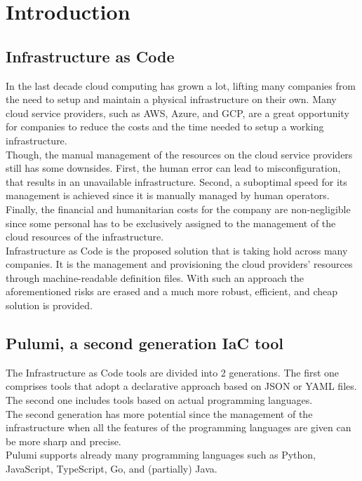 
\chapter{Introduction}
\label{cap:introduction}


\section{Infrastructure as Code}
In the last decade \gls{cloud computing} has grown a lot, lifting many companies from the need to setup and maintain a physical infrastructure on their own.
Many cloud service providers, such as \gls{AWS}, \gls{Azure}, and \gls{GCP}, are a great opportunity for companies to reduce the costs and the time needed to setup a working infrastructure.\\
Though, the manual management of the resources on the cloud service providers still has some downsides. 
First, the human error can lead to misconfiguration, that results in an unavailable infrastructure.
Second, a suboptimal speed for its management is achieved since it is manually managed by human operators.
Finally, the financial and humanitarian costs for the company are non-negligible since some personal has to be exclusively assigned to the management of the cloud resources of the infrastructure.\\
Infrastructure as Code is the proposed solution that is taking hold across many companies.
It is the management and provisioning the cloud providers' resources through machine-readable definition files.
With such an approach the aforementioned risks are erased and a much more robust, efficient, and cheap solution is provided.

\section{Pulumi, a second generation IaC tool}
The Infrastructure as Code tools are divided into 2 generations.
The first one comprises tools that adopt a declarative approach based on JSON or YAML files.
The second one includes tools based on actual programming languages.\\
The second generation has more potential since the management of the infrastructure when all the features of the programming languages are given can be more sharp and precise.\\
Pulumi supports already many programming languages such as Python, JavaScript, TypeScript, Go, and (partially) Java.

